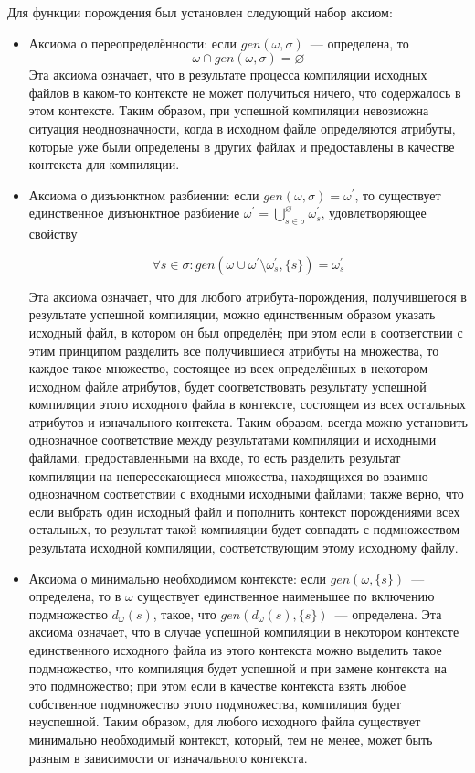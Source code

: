 Для функции порождения был установлен следующий набор аксиом:

\begin{itemize}
	\item Аксиома о переопределённости: если $gen(\omega,\sigma)$~--- определена, то $$\omega \cap gen(\omega,\sigma) = \varnothing$$
	Эта аксиома означает, что в результате процесса компиляции исходных файлов в каком-то контексте не может получиться ничего, что содержалось в этом контексте. Таким образом, при успешной компиляции невозможна ситуация неоднозначности, когда в исходном файле определяются атрибуты, которые уже были определены в других файлах и предоставлены в качестве контекста для компиляции.
	
	\item Аксиома о дизъюнктном разбиении: если $gen(\omega,\sigma) = \omega^\prime$, то существует единственное дизъюнктное разбиение $\omega^\prime=\bigcup^\varnothing_{s\in\sigma}\omega^\prime_s$, 
	удовлетворяющее свойству 

	$$\forall s\in\sigma : gen(\omega\cup\omega^\prime\setminus\omega^\prime_s,\{s\})=\omega^\prime_s$$
	
	Эта аксиома означает, что для любого атрибута-порождения, получившегося в результате успешной компиляции, можно единственным образом указать исходный файл, в котором он был определён; при этом если в соответствии с этим принципом разделить все получившиеся атрибуты на множества, то каждое такое множество, состоящее из всех определённых в некотором исходном файле атрибутов, будет соответствовать результату успешной компиляции этого исходного файла в контексте, состоящем из всех остальных атрибутов и изначального контекста. Таким образом, всегда можно установить однозначное соответствие между результатами компиляции и исходными файлами, предоставленными на входе, то есть разделить результат компиляции на непересекающиеся множества, находящихся во взаимно однозначном соответствии с входными исходными файлами; также верно, что если выбрать один исходный файл и пополнить контекст порождениями всех остальных, то результат такой компиляции будет совпадать с подмножеством результата исходной компиляции, соответствующим этому исходному файлу.

	\item Аксиома о минимально необходимом контексте: если $gen(\omega,\{s\})$~--- определена, то в $\omega$ существует единственное наименьшее по включению подмножество $d_\omega(s)$, такое, что $gen(d_\omega(s), \{s\})$~--- определена. Эта аксиома означает, что в случае успешной компиляции в некотором контексте единственного исходного файла из этого контекста можно выделить такое подмножество, что компиляция будет успешной и при замене контекста на это подмножество; при этом если в качестве контекста взять любое собственное подмножество этого подмножества, компиляция будет неуспешной. Таким образом, для любого исходного файла существует минимально необходимый контекст, который, тем не менее, может быть разным в зависимости от изначального контекста.


\end{itemize}
